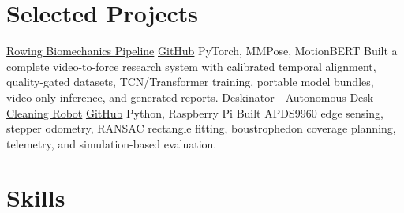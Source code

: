 \section{Selected Projects}
\ProjectEntry
  {\href{https://www.giacomocappelletto.com/research/rowing-biomechanics}{Rowing Biomechanics Pipeline} \enspace\textbar\enspace \href{https://github.com/JJCAPPE/rowing-dynamics-analysis}{GitHub}}
  {PyTorch, MMPose, MotionBERT}
  {Built a complete video-to-force research system with calibrated temporal alignment, quality-gated datasets, TCN/Transformer training, portable model bundles, video-only inference, and generated reports.}
\ProjectEntry
  {\href{https://www.giacomocappelletto.com/projects/deskinator}{Deskinator - Autonomous Desk-Cleaning Robot} \enspace\textbar\enspace \href{https://github.com/JJCAPPE/deskinator}{GitHub}}
  {Python, Raspberry Pi}
  {Built APDS9960 edge sensing, stepper odometry, RANSAC rectangle fitting, boustrophedon coverage planning, telemetry, and simulation-based evaluation.}

\AthleticsAwards

\section{Skills}
